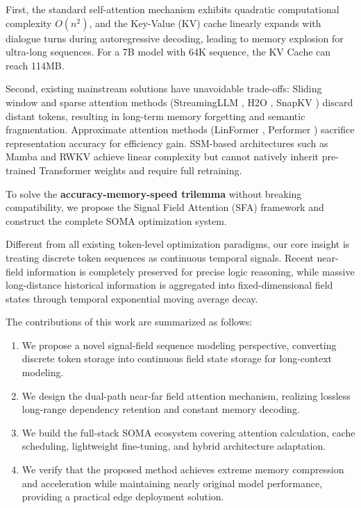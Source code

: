 \documentclass{article}
\begin{document}
First, the standard self-attention mechanism exhibits quadratic computational complexity $O(n^2)$, and the Key-Value (KV) cache linearly expands with dialogue turns during autoregressive decoding, leading to memory explosion for ultra-long sequences. For a 7B model with 64K sequence, the KV Cache can reach 114MB.

Second, existing mainstream solutions have unavoidable trade-offs:
Sliding window and sparse attention methods (StreamingLLM \cite{streamingllm2024}, H2O \cite{h2o2023}, SnapKV \cite{snapkv2024}) discard distant tokens, resulting in long-term memory forgetting and semantic fragmentation. Approximate attention methods (LinFormer \cite{linformer}, Performer \cite{performer}) sacrifice representation accuracy for efficiency gain. SSM-based architectures such as Mamba \cite{mamba2024} and RWKV \cite{rwkv2023} achieve linear complexity but cannot natively inherit pre-trained Transformer weights and require full retraining.

To solve the \textbf{accuracy-memory-speed trilemma} without breaking compatibility, we propose the Signal Field Attention (SFA) framework and construct the complete SOMA optimization system.

Different from all existing token-level optimization paradigms, our core insight is treating discrete token sequences as continuous temporal signals. Recent near-field information is completely preserved for precise logic reasoning, while massive long-distance historical information is aggregated into fixed-dimensional field states through temporal exponential moving average decay.

The contributions of this work are summarized as follows:
\begin{enumerate}
\item We propose a novel signal-field sequence modeling perspective, converting discrete token storage into continuous field state storage for long-context modeling.
\item We design the dual-path near-far field attention mechanism, realizing lossless long-range dependency retention and constant memory decoding.
\item We build the full-stack SOMA ecosystem covering attention calculation, cache scheduling, lightweight fine-tuning, and hybrid architecture adaptation.
\item We verify that the proposed method achieves extreme memory compression and acceleration while maintaining nearly original model performance, providing a practical edge deployment solution.
\end{enumerate}
\end{document}
